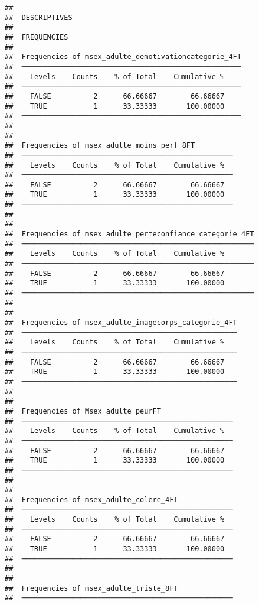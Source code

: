 \documentclass[
]{article}
\begin{document}
\begin{verbatim}
## 
##  DESCRIPTIVES
## 
##  FREQUENCIES
## 
##  Frequencies of msex_adulte_demotivationcategorie_4FT 
##  ──────────────────────────────────────────────────── 
##    Levels    Counts    % of Total    Cumulative %   
##  ──────────────────────────────────────────────────── 
##    FALSE          2      66.66667        66.66667   
##    TRUE           1      33.33333       100.00000   
##  ──────────────────────────────────────────────────── 
## 
## 
##  Frequencies of msex_adulte_moins_perf_8FT          
##  ────────────────────────────────────────────────── 
##    Levels    Counts    % of Total    Cumulative %   
##  ────────────────────────────────────────────────── 
##    FALSE          2      66.66667        66.66667   
##    TRUE           1      33.33333       100.00000   
##  ────────────────────────────────────────────────── 
## 
## 
##  Frequencies of msex_adulte_perteconfiance_categorie_4FT 
##  ─────────────────────────────────────────────────────── 
##    Levels    Counts    % of Total    Cumulative %   
##  ─────────────────────────────────────────────────────── 
##    FALSE          2      66.66667        66.66667   
##    TRUE           1      33.33333       100.00000   
##  ─────────────────────────────────────────────────────── 
## 
## 
##  Frequencies of msex_adulte_imagecorps_categorie_4FT 
##  ─────────────────────────────────────────────────── 
##    Levels    Counts    % of Total    Cumulative %   
##  ─────────────────────────────────────────────────── 
##    FALSE          2      66.66667        66.66667   
##    TRUE           1      33.33333       100.00000   
##  ─────────────────────────────────────────────────── 
## 
## 
##  Frequencies of Msex_adulte_peurFT                  
##  ────────────────────────────────────────────────── 
##    Levels    Counts    % of Total    Cumulative %   
##  ────────────────────────────────────────────────── 
##    FALSE          2      66.66667        66.66667   
##    TRUE           1      33.33333       100.00000   
##  ────────────────────────────────────────────────── 
## 
## 
##  Frequencies of msex_adulte_colere_4FT              
##  ────────────────────────────────────────────────── 
##    Levels    Counts    % of Total    Cumulative %   
##  ────────────────────────────────────────────────── 
##    FALSE          2      66.66667        66.66667   
##    TRUE           1      33.33333       100.00000   
##  ────────────────────────────────────────────────── 
## 
## 
##  Frequencies of msex_adulte_triste_8FT              
##  ────────────────────────────────────────────────── 

\end{verbatim}
\end{document}

